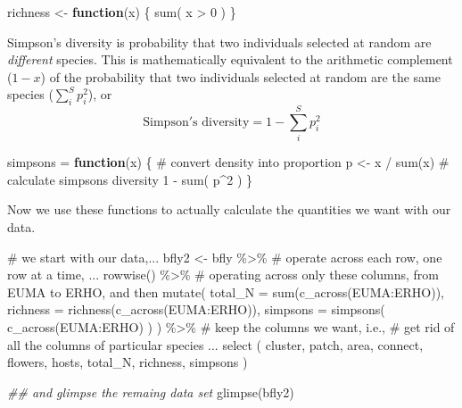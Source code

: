 \documentclass[
  letterpaper,
  DIV=11,
  numbers=noendperiod]{scrreprt}
\newenvironment{Shaded}{\begin{snugshade}}{\end{snugshade}}
\newcommand{\AttributeTok}[1]{\textcolor[rgb]{0.40,0.45,0.13}{#1}}
\newcommand{\CommentTok}[1]{\textcolor[rgb]{0.37,0.37,0.37}{#1}}
\newcommand{\ControlFlowTok}[1]{\textcolor[rgb]{0.00,0.23,0.31}{\textbf{#1}}}
\newcommand{\DecValTok}[1]{\textcolor[rgb]{0.68,0.00,0.00}{#1}}
\newcommand{\DocumentationTok}[1]{\textcolor[rgb]{0.37,0.37,0.37}{\textit{#1}}}
\newcommand{\FunctionTok}[1]{\textcolor[rgb]{0.28,0.35,0.67}{#1}}
\newcommand{\NormalTok}[1]{\textcolor[rgb]{0.00,0.23,0.31}{#1}}
\newcommand{\OtherTok}[1]{\textcolor[rgb]{0.00,0.23,0.31}{#1}}
\newcommand{\SpecialCharTok}[1]{\textcolor[rgb]{0.37,0.37,0.37}{#1}}
\begin{document}
\begin{Shaded}
\begin{Highlighting}[]
\NormalTok{richness }\OtherTok{\textless{}{-}} \ControlFlowTok{function}\NormalTok{(x) \{ }\FunctionTok{sum}\NormalTok{( x }\SpecialCharTok{\textgreater{}} \DecValTok{0}\NormalTok{ ) \}}
\end{Highlighting}
\end{Shaded}

Simpson's diversity is probability that two individuals selected at
random are \emph{different} species. This is mathematically equivalent
to the arithmetic complement (\(1-x\)) of the probability that two
individuals selected at random are the same species
(\(\sum_i^S p_i^2\)), or
\[\mathrm{Simpson's\,\,diversity} = 1 - \sum_i^S p_i^2\]

\begin{Shaded}
\begin{Highlighting}[]
\NormalTok{simpsons }\OtherTok{=} \ControlFlowTok{function}\NormalTok{(x) \{}
  \CommentTok{\# convert density into proportion}
\NormalTok{  p }\OtherTok{\textless{}{-}}\NormalTok{ x }\SpecialCharTok{/} \FunctionTok{sum}\NormalTok{(x)}
  \CommentTok{\# calculate simpson\textquotesingle{}s diversity}
  \DecValTok{1} \SpecialCharTok{{-}} \FunctionTok{sum}\NormalTok{( p}\SpecialCharTok{\^{}}\DecValTok{2}\NormalTok{ )}
\NormalTok{\}}
\end{Highlighting}
\end{Shaded}

Now we use these functions to actually calculate the quantities we want
with our data.

\begin{Shaded}
\begin{Highlighting}[]
\CommentTok{\# we start with our data,...}
\NormalTok{bfly2 }\OtherTok{\textless{}{-}}\NormalTok{ bfly }\SpecialCharTok{\%\textgreater{}\%}
  \CommentTok{\# operate across each row, one row at a time, ...}
  \FunctionTok{rowwise}\NormalTok{() }\SpecialCharTok{\%\textgreater{}\%}
  \CommentTok{\# operating across only these columns, from EUMA to ERHO, and then}
  \FunctionTok{mutate}\NormalTok{(}
    \AttributeTok{total\_N =}  \FunctionTok{sum}\NormalTok{(}\FunctionTok{c\_across}\NormalTok{(EUMA}\SpecialCharTok{:}\NormalTok{ERHO)),}
    \AttributeTok{richness =} \FunctionTok{richness}\NormalTok{(}\FunctionTok{c\_across}\NormalTok{(EUMA}\SpecialCharTok{:}\NormalTok{ERHO)),}
    \AttributeTok{simpsons =} \FunctionTok{simpsons}\NormalTok{( }\FunctionTok{c\_across}\NormalTok{(EUMA}\SpecialCharTok{:}\NormalTok{ERHO) )}
\NormalTok{  ) }\SpecialCharTok{\%\textgreater{}\%}
  \CommentTok{\# keep the columns we want, i.e., }
  \CommentTok{\# get rid of all the columns of particular species ...}
  \FunctionTok{select}\NormalTok{ ( cluster, patch, area, connect, flowers, hosts, total\_N, richness, simpsons )}

\DocumentationTok{\#\# and glimpse the remaing data set}
\FunctionTok{glimpse}\NormalTok{(bfly2)}
\end{Highlighting}
\end{Shaded}
\end{document}
